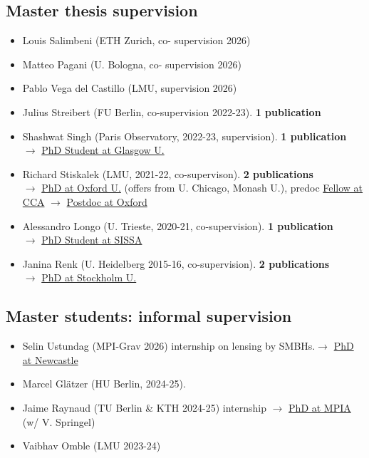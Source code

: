 \documentclass[11pt,a4paper]{article}
\begin{document}
\subsection*{Master thesis supervision}
\begin{itemize}\setlength{\itemsep}{1pt}
  \item {Louis Salimbeni} (ETH Zurich, co-
supervision 2026)
  \item {Matteo Pagani} (U. Bologna, co-
supervision 2026)
  \item {Pablo Vega del Castillo} (LMU, supervision 2026)
  \item {Julius Streibert}  (FU Berlin, co-supervision 2022-23).  \textbf{1 publication} %
\item {Shashwat Singh} (Paris Observatory, 2022-23, supervision). \textbf{1 publication} \\ $\longrightarrow$ \underline{PhD Student at Glasgow U.} %
  \item {Richard Stiskalek} (LMU, 2021-22, co-supervison). \textbf{2 publications} %
  \\ $\longrightarrow$ \underline{PhD at Oxford U.} (offers from U. Chicago, Monash U.), predoc \underline{Fellow at CCA} $\longrightarrow$ \underline{Postdoc at Oxford}

   \item {Alessandro Longo} (U. Trieste, 2020-21, co-supervision).  %
   \textbf{1 publication} \\
$\longrightarrow$ \underline{PhD Student at SISSA}

 \item {Janina Renk} (U. Heidelberg 2015-16, co-supervision). \textbf{2 publications} %
 \\ $\longrightarrow$ \underline{PhD at Stockholm U.} %
\end{itemize}

\subsection*{Master students: informal supervision}
\begin{itemize}\setlength{\itemsep}{1pt}
 \item {Selin Ustundag} (MPI-Grav 2026) internship on lensing by SMBHs.$\longrightarrow$ \underline{PhD at Newcastle}
  \item {Marcel Gl\"atzer} (HU Berlin, 2024-25).
  \item {Jaime Raynaud} (TU Berlin \& KTH 2024-25) internship %
  $\longrightarrow$ \underline{PhD at MPIA} (w/ V. Springel)
  \item {Vaibhav Omble} (LMU 2023-24)
\end{itemize}
\end{document}

